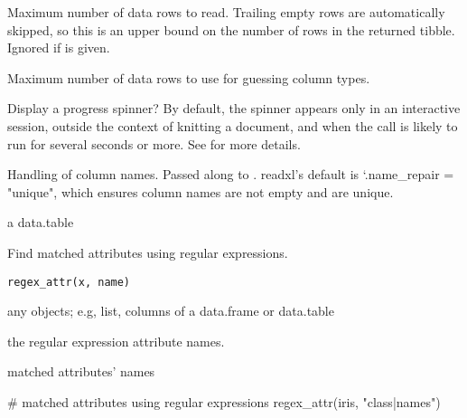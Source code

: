 \documentclass[letterpaper]{book}
\begin{document}
\begin{Arguments}
\begin{ldescription}
\item[\code{n\_max}] Maximum number of data rows to read. Trailing empty rows are
automatically skipped, so this is an upper bound on the number of rows in
the returned tibble. Ignored if  is given.

\item[\code{guess\_max}] Maximum number of data rows to use for guessing column
types.

\item[\code{progress}] Display a progress spinner? By default, the spinner appears
only in an interactive session, outside the context of knitting a document,
and when the call is likely to run for several seconds or more. See
 for more details.

\item[\code{.name\_repair}] Handling of column names. Passed along to
. readxl's default is `.name\_repair = "unique", which
ensures column names are not empty and are unique.
\end{ldescription}
\end{Arguments}
%
\begin{Value}
a data.table
\end{Value}
%
\begin{Description}
Find matched attributes using regular expressions.
\end{Description}
%
\begin{Usage}
\begin{verbatim}
regex_attr(x, name)
\end{verbatim}
\end{Usage}
%
\begin{Arguments}
\begin{ldescription}
\item[\code{x}] any objects; e.g, list, columns of a data.frame or data.table

\item[\code{name}] the regular expression attribute names.
\end{ldescription}
\end{Arguments}
%
\begin{Value}
matched attributes' names
\end{Value}
%
\begin{Examples}
\begin{ExampleCode}
# matched attributes using regular expressions
regex_attr(iris, "class|names")

\end{ExampleCode}
\end{Examples}
\end{document}
